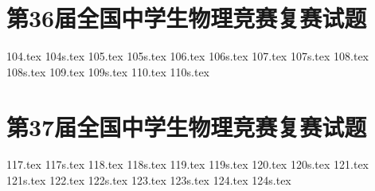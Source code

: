 \section{第36届全国中学生物理竞赛复赛试题}
{104.tex}
{104s.tex}
{105.tex}
{105s.tex}
{106.tex}
{106s.tex}
{107.tex}
{107s.tex}
{108.tex}
{108s.tex}
{109.tex}
{109s.tex}
{110.tex}
{110s.tex}
\section{第37届全国中学生物理竞赛复赛试题}
{117.tex}
{117s.tex}
{118.tex}
{118s.tex}
{119.tex}
{119s.tex}
{120.tex}
{120s.tex}
{121.tex}
{121s.tex}
{122.tex}
{122s.tex}
{123.tex}
{123s.tex}
{124.tex}
{124s.tex}
\newpage